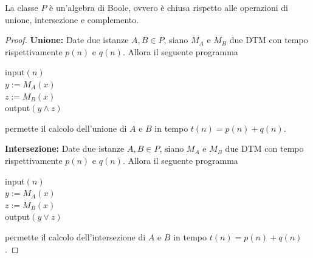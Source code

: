 \begin{theor}
	La classe $P$ è un'algebra di Boole, ovvero è chiusa rispetto alle operazioni di unione, intersezione e complemento.
\end{theor}
\begin{proof}
	
	\textbf{Unione:} Date due istanze $A,B \in P$, siano $M_A$ e $M_B$ due DTM con tempo rispettivamente $p(n)$ e $q(n)$. Allora il seguente programma
	\begin{center}
		\begin{minipage}{.33\textwidth}
			\begin{tcolorbox}[
				colback=white,
				sharp corners,
				boxrule=.3mm,
				left=20pt,
				top=0pt,
				bottom=0pt,
				colbacktitle=white,
				coltitle=black
				]
				\begin{algorithm}[H]
					\SetAlgoNoEnd
					input$(n)$\\
					$y := M_A (x)$\\
					$z := M_B (x)$ \\
					output$(y \wedge z)$
				\end{algorithm}
			\end{tcolorbox}
		\end{minipage}
	\end{center}
	permette il calcolo dell'unione di $A$ e $B$ in tempo $t(n) = p(n) + q(n)$.
	
	\textbf{Intersezione:} Date due istanze $A,B \in P$, siano $M_A$ e $M_B$ due DTM con tempo rispettivamente $p(n)$ e $q(n)$. Allora il seguente programma
	\begin{center}
		\begin{minipage}{.33\textwidth}
			\begin{tcolorbox}[
				colback=white,
				sharp corners,
				boxrule=.3mm,
				left=20pt,
				top=0pt,
				bottom=0pt,
				colbacktitle=white,
				coltitle=black
				]
				\begin{algorithm}[H]
					\SetAlgoNoEnd
					input$(n)$\\
					$y := M_A (x)$\\
					$z := M_B (x)$ \\
					output$(y \vee z)$
				\end{algorithm}
			\end{tcolorbox}
		\end{minipage}
	\end{center}
	permette il calcolo dell'intersezione di $A$ e $B$ in tempo $t(n) = p(n) + q(n)$.
	

\end{proof}
